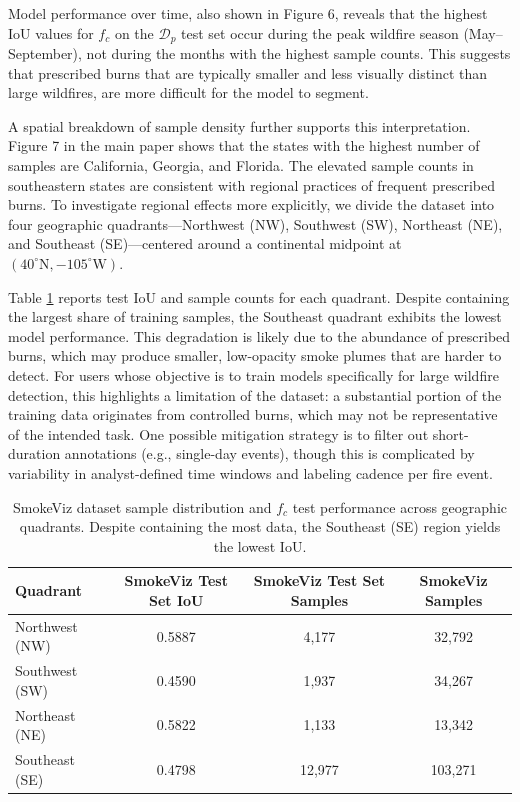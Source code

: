 \documentclass{article}
\begin{document}
Model performance over time, also shown in Figure 6, reveals that the highest IoU values for \(f_{c}\) on the \(\mathcal{D}_p\) test set occur during the peak wildfire season (May–September), not during the months with the highest sample counts. This suggests that prescribed burns that are typically smaller and less visually distinct than large wildfires, are more difficult for the model to segment.

A spatial breakdown of sample density further supports this interpretation. Figure 7 in the main paper shows that the states with the highest number of samples are California, Georgia, and Florida. The elevated sample counts in southeastern states are consistent with regional practices of frequent prescribed burns. To investigate regional effects more explicitly, we divide the dataset into four geographic quadrants—Northwest (NW), Southwest (SW), Northeast (NE), and Southeast (SE)—centered around a continental midpoint at \((40^\circ\mathrm{N}, -105^\circ\mathrm{W})\).

Table \ref{quad} reports test IoU and sample counts for each quadrant. Despite containing the largest share of training samples, the Southeast quadrant exhibits the lowest model performance. This degradation is likely due to the abundance of prescribed burns, which may produce smaller, low-opacity smoke plumes that are harder to detect. For users whose objective is to train models specifically for large wildfire detection, this highlights a limitation of the dataset: a substantial portion of the training data originates from controlled burns, which may not be representative of the intended task. One possible mitigation strategy is to filter out short-duration annotations (e.g., single-day events), though this is complicated by variability in analyst-defined time windows and labeling cadence per fire event.

\begin{table}[!htb]
    \caption{SmokeViz dataset sample distribution and \(f_{c}\) test performance across geographic quadrants. Despite containing the most data, the Southeast (SE) region yields the lowest IoU.}
    \label{quad}
    \centering
    \begin{tabular}{lccc}
        \toprule
        Quadrant & SmokeViz Test Set IoU & SmokeViz Test Set Samples & SmokeViz Samples \\
        \midrule
        Northwest (NW) & 0.5887 & 4,177 & 32,792 \\
        Southwest (SW) & 0.4590 & 1,937 & 34,267 \\
        Northeast (NE) & 0.5822 & 1,133 & 13,342 \\
        Southeast (SE) & 0.4798 & 12,977 & 103,271 \\
        \bottomrule
    \end{tabular}
\end{table}
\end{document}
